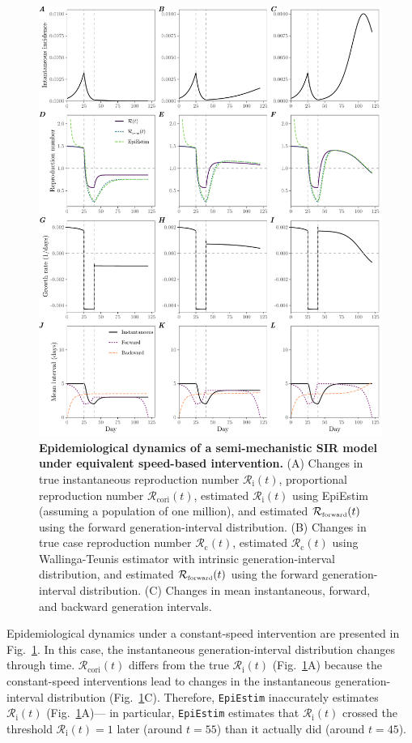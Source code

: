 \documentclass[12pt]{article}
\newcommand{\fref}[1]{Fig.~\ref{fig:#1}}
\newcommand{\Rx}[1]{\ensuremath{{\mathcal R}_{#1}}\xspace}
\newcommand{\Rc}{\Rx{\mathrm{c}}}
\newcommand{\Ri}{\Rx{\mathrm{i}}}
\newcommand{\RR}{\ensuremath{{\mathcal R}}\xspace}
\newcommand{\Rcori}{\Rx{\mathrm{cori}}}
\newcommand{\tsub}[2]{#1_{{\textrm{\tiny #2}}}}
\begin{document}
\begin{figure}
\includegraphics[width=\textwidth]{figure_sir_semi.pdf}
\caption{
\textbf{Epidemiological dynamics of a semi-mechanistic SIR model under equivalent speed-based intervention.}
(A) Changes in true instantaneous reproduction number $\Ri(t)$, proportional reproduction number $\Rcori(t)$, estimated $\Ri(t)$ using EpiEstim (assuming a population of one million), and estimated $\tsub{\RR}{forward}(t)$ using the forward generation-interval distribution.
(B) Changes in true case reproduction number $\Rc(t)$, estimated $\Rc(t)$ using Wallinga-Teunis estimator with intrinsic generation-interval distribution, and estimated $\tsub{\RR}{forward}(t)$ using the forward generation-interval distribution.
(C) Changes in mean instantaneous, forward, and backward generation intervals.
}
\label{fig:sir_semi}
\end{figure}

Epidemiological dynamics under a constant-speed intervention are presented in \fref{sir_semi}.
In this case, the instantaneous generation-interval distribution changes through time.  
$\Rcori(t)$ differs from the true $\Ri(t)$ (\fref{sir_semi}A) because the constant-speed interventions lead to changes in the instantaneous generation-interval distribution (\fref{sir_semi}C).
Therefore, \texttt{EpiEstim} inaccurately estimates $\Ri(t)$ (\fref{sir_semi}A)---
in particular, \texttt{EpiEstim} estimates that $\Ri(t)$ crossed the threshold $\Ri(t)=1$ later (around $t=55$) than it actually did (around $t=45$).
\end{document}
